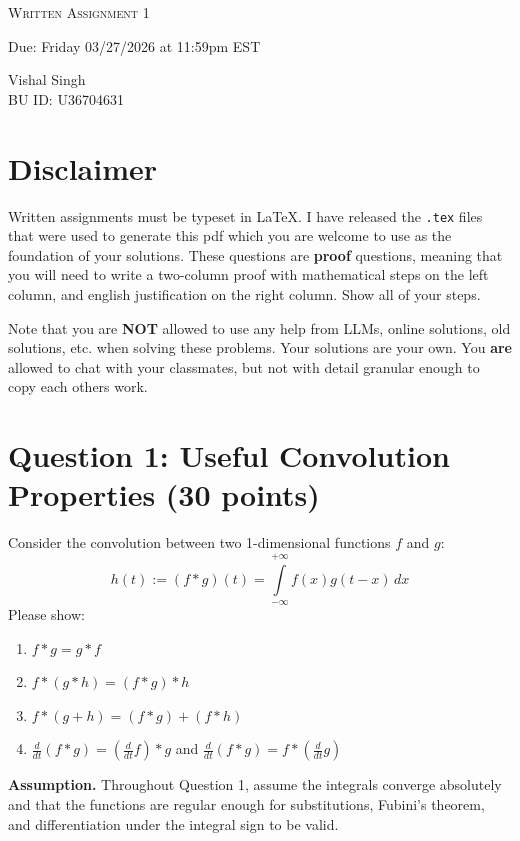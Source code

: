 \documentclass[11pt]{article}
\newcommand{\question}[1]{\section*{\normalsize #1}}
\begin{document}
\begin{center}
    {\Large \textsc{Written Assignment 1}}
\end{center}
\begin{center}
    Due: Friday 03/27/2026 at 11:59pm EST
\end{center}
\begin{center}
    Vishal Singh\\
    BU ID: U36704631
\end{center}

\section*{\textbf{Disclaimer}}
Written assignments must be typeset in \LaTeX. I have released the \texttt{.tex} files that were used to generate this pdf which you are welcome to use as the foundation of your solutions. These questions are \textbf{proof} questions, meaning that you will need to write a two-column proof with mathematical steps on the left column, and english justification on the right column. Show all of your steps.\newline\newline

\noindent Note that you are \textbf{NOT} allowed to use any help from LLMs, online solutions, old solutions, etc. when solving these problems. Your solutions are your own. You \textbf{are} allowed to chat with your classmates, but not with detail granular enough to copy each others work.



\question{Question 1: Useful Convolution Properties (30 points)}
Consider the convolution between two 1-dimensional functions $f$ and $g$:
$$h(t):= (f*g)(t)=\int\limits_{-\infty}^{+\infty} f(x)g(t-x)\,dx$$
Please show:
\begin{enumerate}
    \item $f*g = g*f$
    \item $f*(g*h) = (f*g)*h$
    \item $f*(g+h) = (f*g) + (f*h)$
    \item $\frac{d}{dt}(f*g) = (\frac{d}{dt}f)*g$ and $\frac{d}{dt}(f*g) =f*(\frac{d}{dt}g)$
\end{enumerate}
\noindent\textbf{Assumption.} Throughout Question 1, assume the integrals converge absolutely and that the functions are regular enough for substitutions, Fubini's theorem, and differentiation under the integral sign to be valid.
\end{document}
